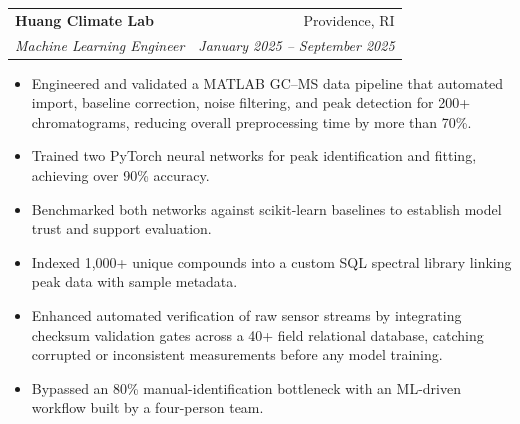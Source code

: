 \documentclass[letterpaper,11pt]{article}
\makeatletter
\newcommand{\resumeItem}[1]{
  \item\small{
    {#1 \vspace{-2pt}}
  }
}
\newcommand{\resumeSubheading}[4]{
  \vspace{-2pt}\item
    \begin{tabular*}{0.97\textwidth}[t]{l@{\extracolsep{\fill}}r}
      \textbf{#1} & #2 \\
      \textit{\small#3} & \textit{\small #4} \\
    \end{tabular*}\vspace{-7pt}
}
\newcommand{\resumeItemListStart}{\begin{itemize}}
\newcommand{\resumeItemListEnd}{\end{itemize}\vspace{-5pt}}
\makeatother
\begin{document}
    \resumeSubheading
      {Huang Climate Lab}{Providence, RI}
      {Machine Learning Engineer}{January 2025 -- September 2025}
      \resumeItemListStart
        \resumeItem{Engineered and validated a MATLAB GC--MS data pipeline that automated import, baseline correction, noise filtering, and peak detection for 200+ chromatograms, reducing overall preprocessing time by more than 70\%.}
        \resumeItem{Trained two PyTorch neural networks for peak identification and fitting, achieving over 90\% accuracy.}
        \resumeItem{Benchmarked both networks against scikit-learn baselines to establish model trust and support evaluation.}
        \resumeItem{Indexed 1,000+ unique compounds into a custom SQL spectral library linking peak data with sample metadata.}
        \resumeItem{Enhanced automated verification of raw sensor streams by integrating checksum validation gates across a 40+ field relational database, catching corrupted or inconsistent measurements before any model training.}
        \resumeItem{Bypassed an 80\% manual-identification bottleneck with an ML-driven workflow built by a four-person team.}
      \resumeItemListEnd
\end{document}
